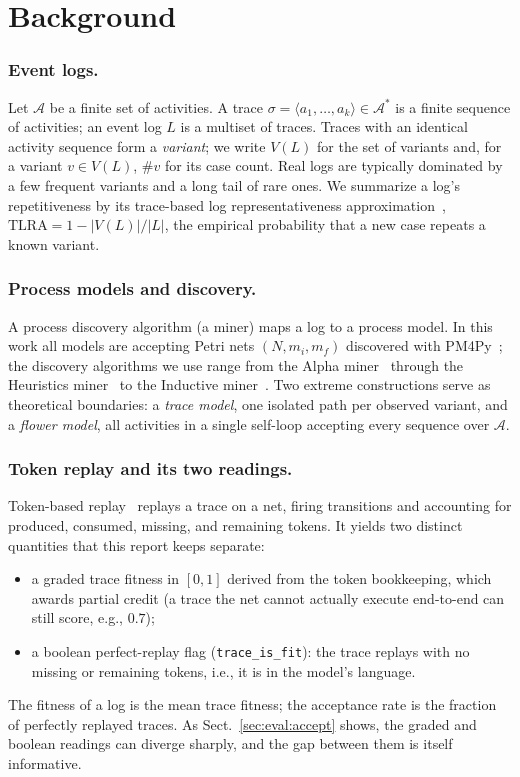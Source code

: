 \documentclass[runningheads]{llncs}
\newcommand{\chg}[1]{\textcolor{chgblue}{#1}}
\begin{document}
\section{Background}
\label{sec:background}

\subsubsection{Event logs.}
Let $\mathcal{A}$ be a finite set of activities. A trace $\sigma=\langle a_1,\dots,a_k\rangle\in\mathcal{A}^{*}$ is a finite sequence of activities; an event log $L$ is a multiset of traces. Traces with an identical activity sequence form a \emph{variant}; we write $V(L)$ for the set of variants and, for a variant $v\in V(L)$, $\#v$ for its case count. Real logs are typically dominated by a few frequent variants and a long tail of rare ones. We summarize a log's repetitiveness by \chg{its trace-based log representativeness approximation~\cite{karunaratne2024representativeness},} $\mathrm{TLRA}=1-|V(L)|/|L|$, the empirical probability that a new case repeats a known variant.

\subsubsection{Process models and discovery.}
A process discovery algorithm (a miner) maps a log to a process model. In this work all models are accepting Petri nets $(N,m_i,m_f)$ discovered with PM4Py~\cite{berti2019pm4py}; the discovery algorithms we use range from the Alpha miner~\cite{vanderaalst2004alpha} through the Heuristics miner~\cite{weijters2006hm} to the Inductive miner~\cite{leemans2013im,leemans2014imf}. Two extreme constructions serve as theoretical boundaries: a \emph{trace model}, one isolated path per observed variant, and a \emph{flower model}, all activities in a single self-loop accepting every sequence over $\mathcal{A}$.

\subsubsection{Token replay and its two readings.}
Token-based replay~\cite{rozinat2008conformance} replays a trace on a net, firing transitions and accounting for produced, consumed, missing, and remaining tokens. It yields two distinct quantities that this report keeps separate:
\begin{itemize}
  \item a graded trace fitness in $[0,1]$ derived from the token bookkeeping, which awards partial credit (a trace the net cannot actually execute end-to-end can still score, e.g., $0.7$);
  \item a boolean perfect-replay flag (\texttt{trace\_is\_fit}): the trace replays with no missing or remaining tokens, i.e., it is in the model's language.
\end{itemize}
The fitness of a log is the mean trace fitness; the acceptance rate is the fraction of perfectly replayed traces. As Sect.~\ref{sec:eval:accept} shows, the graded and boolean readings can diverge sharply, and the gap between them is itself informative.
\end{document}

